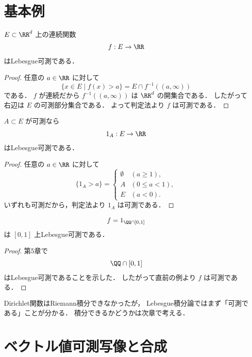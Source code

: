 \section{基本例}

\begin{example}[連続関数]
$E \subset \RR^d$ 上の連続関数
\[
f:E\to\RR
\]
はLebesgue可測である．
\end{example}
\begin{proof}
任意の $a\in\RR$ に対して
\[
\{x\in E \mid f(x)>a\}=E\cap f^{-1}((a,\infty))
\]
である．
$f$ が連続だから $f^{-1}((a,\infty))$ は $\RR^d$ の開集合である．
したがって右辺は $E$ の可測部分集合である．
よって判定法より $f$ は可測である．
\end{proof}

\begin{example}[指示関数]
$A \subset E$ が可測なら
\[
1_A:E\to\RR
\]
はLebesgue可測である．
\end{example}
\begin{proof}
任意の $a\in\RR$ に対して
\[
\{1_A>a\}
=
\begin{cases}
\emptyset & (a\ge 1),\\
A & (0\le a<1),\\
E & (a<0).
\end{cases}
\]
いずれも可測だから，判定法より $1_A$ は可測である．
\end{proof}

\begin{example}[Dirichlet関数]
\[
f=1_{\QQ\cap[0,1]}
\]
は $[0,1]$ 上Lebesgue可測である．
\end{example}
\begin{proof}
第5章で
\[
\QQ\cap[0,1]
\]
はLebesgue可測であることを示した．
したがって直前の例より $f$ は可測である．
\end{proof}

\begin{remark}
Dirichlet関数はRiemann積分できなかったが，
Lebesgue積分論ではまず「可測である」ことが分かる．
積分できるかどうかは次章で考える．
\end{remark}

\section{ベクトル値可測写像と合成}

